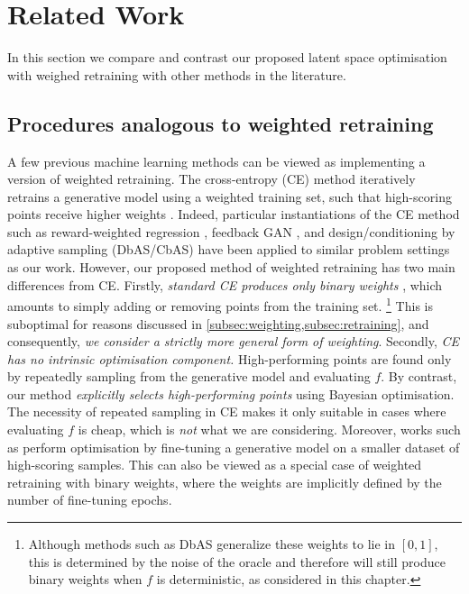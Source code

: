 \section{Related Work}
\label{sec:lso:related-work}
In this section we compare and contrast 
our proposed latent space optimisation with weighed retraining
with other methods in the literature.

\subsection{Procedures analogous to weighted retraining}
A few previous machine learning methods can be viewed as implementing a version of weighted retraining.
The cross-entropy (CE) method iteratively retrains a generative model using a weighted training set,
such that high-scoring points receive higher weights \citep{rubinstein_optimization_1997,rubinstein_cross-entropy_1999,de2005tutorial}.
Indeed, particular instantiations of the CE method such as reward-weighted regression \citep{peters2007reinforcement},
feedback GAN \citep{gupta_feedback_2019},
and design/conditioning by adaptive sampling (DbAS/CbAS) \citep{Brookes_Listgarten_2020,brookes2019conditioning}
have been applied to similar problem settings as our work.
However, our proposed method of weighted retraining has two main differences from CE.
Firstly, \emph{standard CE produces only binary weights} \citep{de2005tutorial}, which amounts to simply adding or removing points from the training set.%
\footnote{Although methods such as DbAS \citep{Brookes_Listgarten_2020} generalize these weights to lie in $[0,1]$, this is determined by the noise of the oracle and therefore will still produce binary weights when $f$ is deterministic, as considered in this chapter.}
This is suboptimal for reasons discussed in \cref{subsec:weighting,subsec:retraining}, and consequently, \emph{we consider a strictly more general form of weighting}.
Secondly, \emph{CE has no intrinsic optimisation component.}
High-performing points are found only by repeatedly sampling from the generative model and evaluating $f$.
By contrast, our method \emph{explicitly selects high-performing points} using Bayesian optimisation.
The necessity of repeated sampling in CE makes it only suitable in cases where evaluating $f$ is cheap, which is \emph{not} what we are considering.
Moreover, works such as \citep{segler_generating_2018} perform optimisation by fine-tuning a generative model on a smaller dataset of high-scoring samples.
This can also be viewed as a special case of weighted retraining with binary weights,
where the weights are implicitly defined by the number of fine-tuning epochs.

